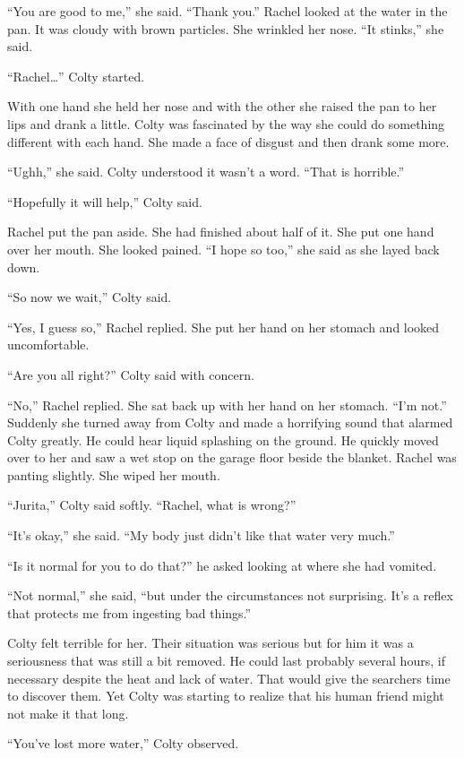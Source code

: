 ``You are good to me,'' she said. ``Thank you.'' Rachel looked at the water in the pan. It was
cloudy with brown particles. She wrinkled her nose. ``It stinks,'' she said.

``Rachel\ldots'' Colty started.

With one hand she held her nose and with the other she raised the pan to her lips and drank a
little. Colty was fascinated by the way she could do something different with each hand. She
made a face of disgust and then drank some more.

``Ughh,'' she said. Colty understood it wasn't a word. ``That is horrible.''

``Hopefully it will help,'' Colty said.

Rachel put the pan aside. She had finished about half of it. She put one hand over her mouth.
She looked pained. ``I hope so too,'' she said as she layed back down.

``So now we wait,'' Colty said.

``Yes, I guess so,'' Rachel replied. She put her hand on her stomach and looked uncomfortable.

``Are you all right?'' Colty said with concern.

``No,'' Rachel replied. She sat back up with her hand on her stomach. ``I'm not.'' Suddenly she
turned away from Colty and made a horrifying sound that alarmed Colty greatly. He could hear
liquid splashing on the ground. He quickly moved over to her and saw a wet stop on the garage
floor beside the blanket. Rachel was panting slightly. She wiped her mouth.

``Jurita,'' Colty said softly. ``Rachel, what is wrong?''

``It's okay,'' she said. ``My body just didn't like that water very much.''

``Is it normal for you to do that?'' he asked looking at where she had vomited.

``Not normal,'' she said, ``but under the circumstances not surprising. It's a reflex that
protects me from ingesting bad things.''

Colty felt terrible for her. Their situation was serious but for him it was a seriousness that
was still a bit removed. He could last probably several hours, if necessary despite the heat and
lack of water. That would give the searchers time to discover them. Yet Colty was starting to
realize that his human friend might not make it that long.

``You've lost more water,'' Colty observed.

